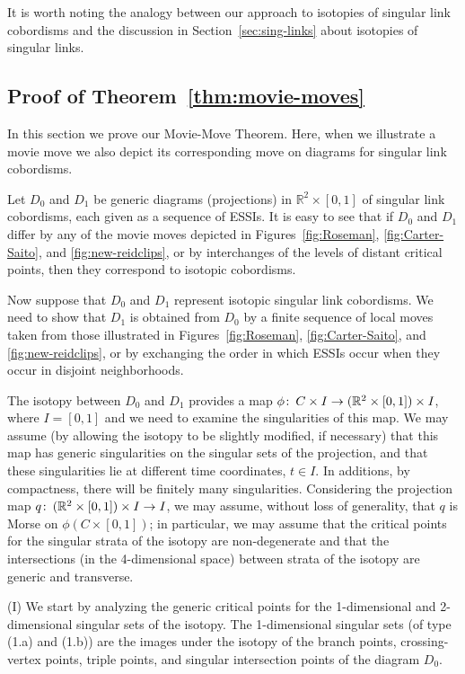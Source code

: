 \documentclass{amsart}\usepackage{amsfonts, amsmath, amssymb}\usepackage{graphicx, epic, epsf, enumerate, stmaryrd}
\theoremstyle{definition}
\numberwithin{equation}{section}
\begin{document}
It is worth noting the analogy between our approach to isotopies of singular link cobordisms and the discussion in Section~\ref{sec:sing-links} about isotopies of singular links.

\subsection{Proof of Theorem~\ref{thm:movie-moves}} In this section we prove our Movie-Move Theorem. Here, when we illustrate a movie move we also depict its corresponding move on diagrams for singular link cobordisms.

Let $D_0$ and $D_1$ be generic diagrams (projections) in ${\mathbb{R}}^2 \times [0, 1]$ of singular link cobordisms, each given as a sequence of ESSIs. It is easy to see that if $D_0$ and $D_1$ differ by any of the movie moves depicted in Figures~\ref{fig:Roseman}, \ref{fig:Carter-Saito}, and \ref{fig:new-reidclips}, or by interchanges of the levels of distant critical points, then they correspond to isotopic cobordisms. 

Now suppose that $D_0$ and $D_1$ represent isotopic singular link cobordisms. We need to show that $D_1$ is obtained from $D_0$ by a finite sequence of local moves taken from those illustrated in Figures~\ref{fig:Roseman}, \ref{fig:Carter-Saito}, and \ref{fig:new-reidclips}, or by exchanging the order in which ESSIs occur when they occur in disjoint neighborhoods.

The isotopy between $D_0$ and $D_1$ provides a map $\phi {\colon\thinspace} C \times I \to ({\mathbb{R}}^2 \times [0, 1]) \times I$, where $I = [0, 1]$ and we need to examine the singularities of this map. We may assume (by allowing the isotopy to be slightly modified, if necessary) that this map has generic singularities on the singular sets of the projection, and that  these singularities lie at different time coordinates, $t \in I$. In additions, by compactness, there will be finitely many singularities. Considering the projection map $q {\colon\thinspace} ({\mathbb{R}}^2 \times [0, 1]) \times I \to I$, we may assume, without loss of generality, that $q$ is Morse on $\phi(C \times [0,1])$; in particular, we may assume that the critical points for the singular strata of the isotopy are non-degenerate and that the intersections (in the 4-dimensional space) between strata of the isotopy are generic and transverse.

(I) We start by analyzing the generic critical points for the 1-dimensional and 2-dimensional singular sets of the isotopy. 
The 1-dimensional singular sets (of type (1.a) and (1.b)) are the images under the isotopy of the branch points, crossing-vertex points, triple points, and singular intersection points of the diagram $D_0$.
\end{document}
